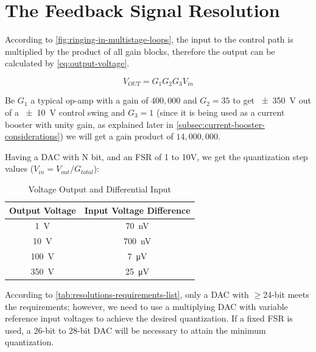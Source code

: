 

\section{The Feedback Signal Resolution}
\label{sec:feedback-signal-resolution}

According to \autoref{fig:ringing-in-multistage-loops}, the input to the control
path is multiplied by the product of all gain blocks, therefore the output
can be calculated by \autoref{eq:output-voltage}.

\begin{equation}
    \label{eq:output-voltage}
    V_{OUT} = {G_1}{G_2}{G_3}{V_{in}}
\end{equation}

Be $G_1$ a typical op-amp with a gain of $400,000$ and $G_2=35$ to
get \SI{\pm350}{\volt} out of a \SI{\pm10}{\volt} control swing
and $G_3=1$ (since it is being used as a current booster with unity gain, as
explained later in \autoref{subsec:current-booster-considerations}) we
will get a gain product of $14,000,000$.

Having a DAC with N bit, and an \ac{FSR} of 1 to 10V, we get the
quantization step values ($V_{in}=V_{out}/G_{total}$):

\begin{table}[h]
    \centering
    \begin{tabular}{cc}
        \toprule
        \textbf{Output Voltage} & \textbf{Input Voltage Difference} \\
        \midrule
        \SI{1}{\volt}           & \SI{70}{\nano\volt}               \\
        \SI{10}{\volt}          & \SI{700}{\nano\volt}              \\
        \SI{100}{\volt}         & \SI{7}{\micro\volt}               \\
        \SI{350}{\volt}         & \SI{25}{\micro\volt}              \\
        \bottomrule
    \end{tabular}
    \caption{Voltage Output and Differential Input}
    \label{tab:output-vs-input-differentials}
\end{table}

According to \autoref{tab:resolutions-requirements-list}, only a \ac{DAC} with
$\ge$24-bit meets the requirements; however, we need to use a multiplying DAC
with variable reference input voltages to achieve the desired quantization.
If a fixed \ac{FSR} is used, a 26-bit to 28-bit DAC will be necessary to attain
the minimum quantization.

